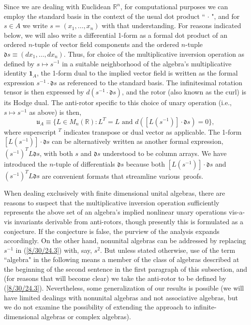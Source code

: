 \documentclass{amsart}
\numberwithin{equation}{section}
\theoremstyle{definition}
\numberwithin{theorem}{section}
\begin{document}
Since we are dealing with Euclidean $\mathbb{R}^n$, for computational purposes we can employ the standard basis in the context of the usual dot product `` $\cdot$ ", and for $s\in A$ we write $s=(x_1,\dots,x_n)$ with that understanding.  For reasons indicated below, we will also write a differential 1-form as a formal dot product of an ordered $n$-tuple of vector field components and the ordered $n$-tuple $\mathfrak{d}s \equiv (dx_1,\dots, dx_n)$. Thus, for choice of the multiplicative inversion operation as defined by $s\mapsto s^{-1}$ in a suitable neighborhood of the algebra's multiplicative identity $\mathbf{1}_A$, the 1-form dual to the implied vector field is written as the formal expression $s^{-1}\cdot \mathfrak{d}s$ as referenced to the standard basis.  The infinitesimal rotation tensor is then expressed by $d(s^{-1}\cdot \mathfrak{d}s)$, and the rotor (also known as the curl) is its Hodge dual. 
The anti-rotor specific to this choice of unary operation (i.e., $s\mapsto s^{-1}$ as above) is then,
\begin{equation}\label{8/30/24.3} \mathfrak{u}_A \equiv \{L\in M_n(\mathbb{R}): L^T=L \text{ and } d(\left[L(s^{-1})\right]\cdot \mathfrak{d}s)  = 0\},\end{equation}
where superscript $^T$ indicates transpose or dual vector as applicable.  The \mbox{1-form} $\left[L(s^{-1})\right]\cdot \mathfrak{d}s$ can be alternatively written as another formal expression, $(s^{-1})^TL\mathfrak{d}s$, with both $s$ and $\mathfrak{d}s$ understood to be column arrays. 
We have introduced the \mbox{$n$-tuple} of differentials $\mathfrak{d}s$ because both $\left[L(s^{-1})\right]\cdot \mathfrak{d}s$ and $(s^{-1})^TL\mathfrak{d}s$ are convenient formats that streamline \mbox{various proofs}.  

When dealing exclusively with finite dimensional unital algebras, there are reasons to suspect that the multiplicative inversion operation sufficiently represents the above set of an algebra's implied nonlinear unary operations vis-a-vis invariants derivable from anti-rotors, though presently this is formulated as a conjecture.  If the conjecture is false, the purview of the analysis expands accordingly.  On the other hand, nonunital algebras can be addressed by replacing $s^{-1}$ in (\ref{8/30/24.3}) with, say, $s^2$.  But unless stated otherwise, use of the term ``algebra" in the following means a member of the class of algebras described at the beginning of the second sentence in the first paragraph of this subsection, and (for reasons that will become clear) we take the anti-rotor to be defined by (\ref{8/30/24.3}).  Nevertheless, some generalization of our results is possible (we will have limited dealings with nonunital algebras and not associative algebras, but we do not examine the possibility of extending the approach to infinite-dimensional algebras or complex algebras). 
\end{document}
